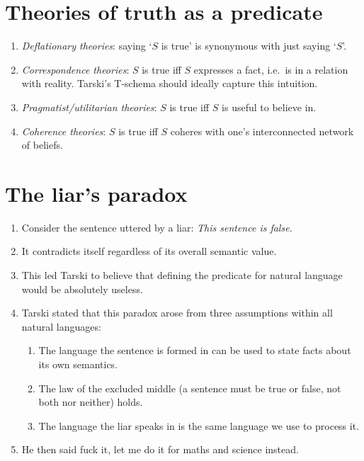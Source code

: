 \section{Theories of truth as a predicate}

\begin{definition}\leavevmode
\begin{enumerate}[label=(\alph*)]
  \item \emph{Deflationary theories}: saying `$S$ is true' is synonymous with just saying `$S$'.
  \item \emph{Correspondence theories}: $S$ is true iff $S$ expresses a fact, i.e.\ is in a relation with reality. Tarski's T-schema should ideally capture this intuition.
  \item \emph{Pragmatist/utilitarian theories}: $S$ is true iff $S$ is useful to believe in.
  \item \emph{Coherence theories}: $S$ is true iff $S$ coheres with one's interconnected network of beliefs.
\end{enumerate}
\end{definition}

\section{The liar's paradox}

\begin{enumerate}[label=(\alph*)]
  \item Consider the sentence uttered by a liar: \emph{This sentence is false.}
  \item It contradicts itself regardless of its overall semantic value.
  \item This led Tarski to believe that defining the predicate for natural language would be absolutely useless.
  \item Tarski stated that this paradox arose from three assumptions within all natural languages:
  \begin{enumerate}[label=\roman*.]
    \item The language the sentence is formed in can be used to state facts about its own semantics.
    \item The law of the excluded middle (a sentence must be true or false, not both nor neither) holds.
    \item The language the liar speaks in is the same language we use to process it.
  \end{enumerate}
  \item He then said fuck it, let me do it for maths and science instead.
\end{enumerate}

